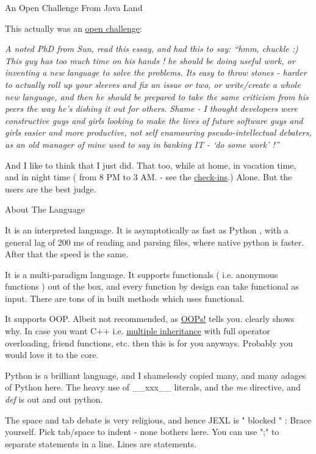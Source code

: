 \begin{subsection}{An Open Challenge From Java Land}

This actually was an \href{http://steve-yegge.blogspot.in/2006/03/execution-in-kingdom-of-nouns.html}{open challenge}:


\emph{A noted PhD from Sun, read this essay, and had this to say: 
``hmm, chuckle :) This guy has too much time on his hands ! he should be doing useful work, or inventing a new language to solve the problems. Its easy to throw stones - harder to actually roll up your sleeves and fix an issue or two, or write/create a whole new language, and then he should be prepared to take the same criticism from his peers the way he's dishing it out for others. Shame - I thought developers were constructive guys and girls looking to make the lives of future software guys and girls easier and more productive, not self enamouring pseudo-intellectual debaters, as an old manager of mine used to say in banking IT - `do some work' !''}


And I like to think that I just did. That too, while at home, in vacation time, and in night time 
( from 8 PM to 3 AM. - see the \href{https://github.com/nmondal/njexl/commits/master}{check-ins}.)
Alone. But the users are the best judge.

\end{subsection}


\begin{subsection}{About The Language}

It is an interpreted language. It is asymptotically as fast as Python , with a general lag of 200 ms of reading and parsing files, where native python is faster. After that the speed is the same.
 
It is a multi-paradigm language. It supports functionals ( i.e. anonymous functions ) out of the box, and every function by design can take functional as input. There are tons of in built methods which uses functional.

It supports OOP. Albeit not recommended, as \href{http://harmful.cat-v.org/software/OO_programming/why_oo_sucks}{OOPs!} tells you.
clearly shows why. In case you want C++ i.e.  \href{http://en.wikipedia.org/wiki/Multiple_inheritance}{multiple inheritance} with full operator overloading, friend functions, etc. then this is for you anyways. 
Probably you would love it to the core.

Python is a brilliant language, and I shamelessly copied many, and many adages of Python here. The heavy use of  \_\_xxx\_\_    
literals, and the \emph{me} directive, and \emph{def} is out and out python. 

The space and tab debate is very religious, and hence JEXL is "{ blocked }" : Brace yourself.
Pick tab/space to indent - none bothers here.
You can use ";" to separate statements in a line. 
Lines are statements.

\end{subsection}


